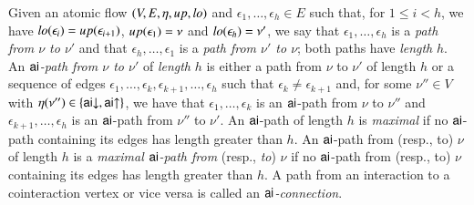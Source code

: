 \begin{definition}\label{definition:FlowPaths}
Given an atomic flow $(V,E,\eta,{\mathit up},{\mathit lo})$ and $\epsilon_1,\dots,\epsilon_h\in E$ such that, for $1\le i<h$, we have ${\mathit lo}(\epsilon_i)={\mathit up}(\epsilon_{i+1})$, ${\mathit up}(\epsilon_1)=\nu$ and ${\mathit lo}(\epsilon_h)=\nu'$, we say that $\epsilon_1,\dots,\epsilon_h$ is a \emph{path from $\nu$ to $\nu'$} and that $\epsilon_h,\dots,\epsilon_1$ is a \emph{path from $\nu'$ to $\nu$}; both paths have \emph{length} $h$. An \emph{$\mathsf{ai}$-path from $\nu$ to $\nu'$} of \emph{length} $h$ is either a path from $\nu$ to $\nu'$ of length $h$ or a sequence of edges $\epsilon_1,\dots,\epsilon_k,\epsilon_{k+1},\dots,\epsilon_h$ such that $\epsilon_k \ne \epsilon_{k+1}$ and, for some $\nu''\in V$ with $\eta(\nu'')\in\{\mathsf{ai}{\downarrow},\mathsf{ai}{\uparrow}\}$, we have that $\epsilon_1,\dots,\epsilon_k$ is an $\mathsf{ai}$-path from $\nu$ to $\nu''$ and $\epsilon_{k+1},\dots,\epsilon_h$ is an $\mathsf{ai}$-path from $\nu''$ to $\nu'$. An $\mathsf{ai}$-path of length $h$ is \emph{maximal} if no $\mathsf{ai}$-path containing its edges has length greater than $h$. An $\mathsf{ai}$-path from (resp., to) $\nu$ of length $h$ is a \emph{maximal\/ $\mathsf{ai}$-path from} (resp., \emph{to}) $\nu$ if no $\mathsf{ai}$-path from (resp., to) $\nu$ containing its edges has length greater than $h$. A path from an interaction to a cointeraction vertex or vice versa is called an \emph{$\mathsf{ai}$-connection}.
\end{definition}

